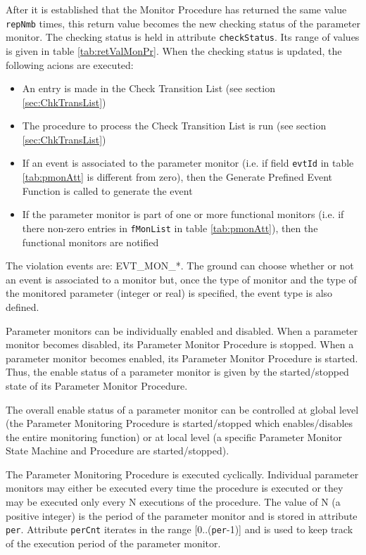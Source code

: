 \documentclass{pnp_article}
\begin{document}
After it is established that the Monitor Procedure has returned the same value \texttt{repNmb} times, this return value becomes the new checking status of the parameter monitor. The checking status is held in attribute \texttt{checkStatus}. Its range of values is given in table \ref{tab:retValMonPr}. When the checking status is updated, the following acions are executed:

\begin{itemize}
\item An entry is made in the Check Transition List (see section \ref{sec:ChkTransList})
\item The procedure to process the Check Transition List is run (see section \ref{sec:ChkTransList})
\item If an event is associated to the parameter monitor (i.e. if field \texttt{evtId} in table \ref{tab:pmonAtt} is different from zero), then the Generate Prefined Event Function is called to generate the event
\item If the parameter monitor is part of one or more functional monitors (i.e. if there non-zero entries in \texttt{fMonList} in table \ref{tab:pmonAtt}), then the functional monitors are notified
\end{itemize}

The violation events are: EVT\_MON\_*. The ground can choose whether or not an event is associated to a monitor but, once the type of monitor and the type of the monitored parameter (integer or real) is specified, the event type is also defined.

Parameter monitors can be individually enabled and disabled. When a parameter monitor becomes disabled, its Parameter Monitor Procedure is stopped. When a parameter monitor becomes enabled, its Parameter Monitor Procedure is started. Thus, the enable status of a parameter monitor is given by the started/stopped state of its Parameter Monitor Procedure.

The overall enable status of a parameter monitor can be controlled at global level (the Parameter Monitoring Procedure is started/stopped which enables/disables the entire monitoring function) or at local level (a specific Parameter Monitor State Machine and Procedure are started/stopped).

The Parameter Monitoring Procedure is executed cyclically. Individual parameter monitors may either be executed every time the procedure is executed or they may be executed only every N executions of the procedure. The value of N (a positive integer) is the period of the parameter monitor and is stored in attribute \texttt{per}. Attribute \texttt{perCnt} iterates in the range [0..(\texttt{per}-1)] and is used to keep track of the execution period of the parameter monitor.
\end{document}
